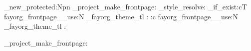 \ExplSyntaxOn

\cs_new_protected:Npn \fayorg_project_make_frontpage:
  {
    \fayorg_style_resolve:
    \cs_if_exist:cT
      { fayorg_frontpage_\tl_use:N \g_fayorg_theme_tl : }
      {
        \use:c { fayorg_frontpage_\tl_use:N \g_fayorg_theme_tl : }
      }
  }

\NewDocumentCommand{\MakeProjectFrontPage}{}
  { \fayorg_project_make_frontpage: }

\ExplSyntaxOff
